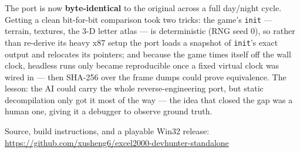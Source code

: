 \documentclass[10pt]{article}
\begin{document}
The port is now \textbf{byte-identical} to the original across a
full day/night cycle. Getting a clean bit-for-bit comparison took two tricks: the
game's \texttt{init} --- terrain, textures, the 3-D letter atlas --- is
deterministic (RNG seed 0), so rather than re-derive its heavy x87 setup the port
loads a snapshot of \texttt{init}'s exact output and relocates its pointers; and
because the game times itself off the wall clock, headless runs only became
reproducible once a fixed virtual clock was wired in --- then SHA-256 over the
frame dumps could prove equivalence. The lesson: the AI could carry the whole
reverse-engineering port, but static decompilation only got it most of the way
--- the idea that closed the gap was a human one, giving it a debugger to observe
ground truth.

Source, build instructions, and a playable Win32 release:\\
\url{https://github.com/xusheng6/excel2000-devhunter-standalone}
\end{document}
